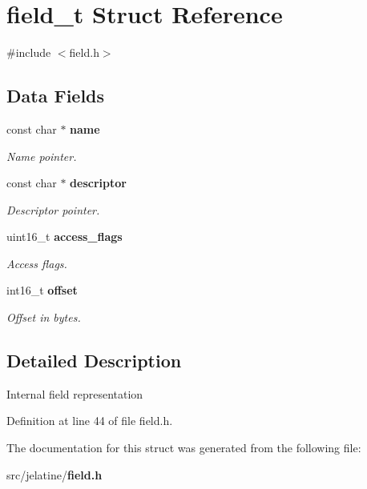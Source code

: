 \section{field\_\-t Struct Reference}
\label{structfield__t}


{\ttfamily \#include $<$field.h$>$}

\subsection*{Data Fields}
\begin{DoxyCompactItemize}
\item 
const char $\ast$ {\bf name}\label{structfield__t_a2a6fd8ac7b6961e04653157153d0b82b}

\begin{DoxyCompactList}\small\item\em Name pointer. \item\end{DoxyCompactList}\item 
const char $\ast$ {\bf descriptor}\label{structfield__t_a5debe0110eaa5140a0d0bf7005d0d2b1}

\begin{DoxyCompactList}\small\item\em Descriptor pointer. \item\end{DoxyCompactList}\item 
uint16\_\-t {\bf access\_\-flags}\label{structfield__t_abf1c3667fb63cead44477569ccfdb0e0}

\begin{DoxyCompactList}\small\item\em Access flags. \item\end{DoxyCompactList}\item 
int16\_\-t {\bf offset}\label{structfield__t_ac83b622557f222580350f9e0c63eeef4}

\begin{DoxyCompactList}\small\item\em Offset in bytes. \item\end{DoxyCompactList}\end{DoxyCompactItemize}


\subsection{Detailed Description}
Internal field representation 

Definition at line 44 of file field.h.



The documentation for this struct was generated from the following file:\begin{DoxyCompactItemize}
\item 
src/jelatine/{\bf field.h}\end{DoxyCompactItemize}
